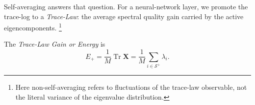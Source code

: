 \documentclass[10pt,twocolumn]{article}
\newcommand{\Tr}{\operatorname{Tr}}
\newcommand{\X}{\mathbf X}
\newcommand{\Xtilde}{\widetilde{\mathbf X}}
\newcommand{\Rell}{\mathcal R}
\newcommand{\Splus}{\mathcal S^+}
\newcommand{\Mred}{M_{\Rell}}
\newcommand{\takeaway}[1]{%
  \par\vspace{4pt}\noindent\textcolor{boxblue}{#1}%
}
\newcommand{\eqtight}[1]{\[\vspace{-1pt}#1\vspace{-3pt}\]}
\begin{document}
Self-averaging answers that question.
For a neural-network layer, we promote the trace-log to a \emph{Trace-Law}: the average spectral quality gain carried by the active eigencomponents.
\footnote{Here non-self-averaging refers to fluctuations of the trace-law observable, not the literal variance of the eigenvalue distribution.}




The \emph{Trace-Law Gain or Energy} is
\begin{equation}
  E_+
  =\frac{1}{M}\Tr \X
=\frac{1}{M}\sum_{i\in\Splus}\lambda_i.
\label{eq:layerenergy}
\end{equation}
\end{document}

